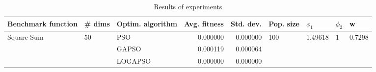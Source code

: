 \begin{table}
\centering
\caption{Results of experiments}
\begin{tabular}{lllrrllll}
\toprule
         Benchmark function &             \# dims & Optim. algorithm &  Avg. fitness &  Std. dev. &            Pop. size &               $\phi_{1}$ &         $\phi_{2}$ &                       w \\
\midrule
\multirow{3}{*}{Square Sum} & \multirow{3}{*}{50} &              PSO &      0.000000 &   0.000000 & \multirow{3}{*}{100} & \multirow{3}{*}{1.49618} & \multirow{3}{*}{1} & \multirow{3}{*}{0.7298} \\
                            &                     &            GAPSO &      0.000119 &   0.000064 &                      &                          &                    &                         \\
                            &                     &          LOGAPSO &      0.000000 &   0.000000 &                      &                          &                    &                         \\
\bottomrule
\end{tabular}
\end{table}

